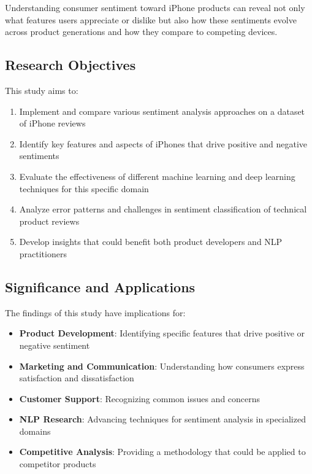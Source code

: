 \documentclass[
]{article}
\providecommand{\tightlist}{%
  \setlength{\itemsep}{0pt}\setlength{\parskip}{0pt}}\usepackage{longtable,booktabs,array}
\begin{document}
Understanding consumer sentiment toward iPhone products can reveal not
only what features users appreciate or dislike but also how these
sentiments evolve across product generations and how they compare to
competing devices.

\subsection{Research Objectives}\label{research-objectives}

This study aims to:

\begin{enumerate}
\def\labelenumi{\arabic{enumi}.}
\tightlist
\item
  Implement and compare various sentiment analysis approaches on a
  dataset of iPhone reviews
\item
  Identify key features and aspects of iPhones that drive positive and
  negative sentiments
\item
  Evaluate the effectiveness of different machine learning and deep
  learning techniques for this specific domain
\item
  Analyze error patterns and challenges in sentiment classification of
  technical product reviews
\item
  Develop insights that could benefit both product developers and NLP
  practitioners
\end{enumerate}

\subsection{Significance and
Applications}\label{significance-and-applications}

The findings of this study have implications for:

\begin{itemize}
\tightlist
\item
  \textbf{Product Development}: Identifying specific features that drive
  positive or negative sentiment
\item
  \textbf{Marketing and Communication}: Understanding how consumers
  express satisfaction and dissatisfaction
\item
  \textbf{Customer Support}: Recognizing common issues and concerns
\item
  \textbf{NLP Research}: Advancing techniques for sentiment analysis in
  specialized domains
\item
  \textbf{Competitive Analysis}: Providing a methodology that could be
  applied to competitor products
\end{itemize}
\end{document}

